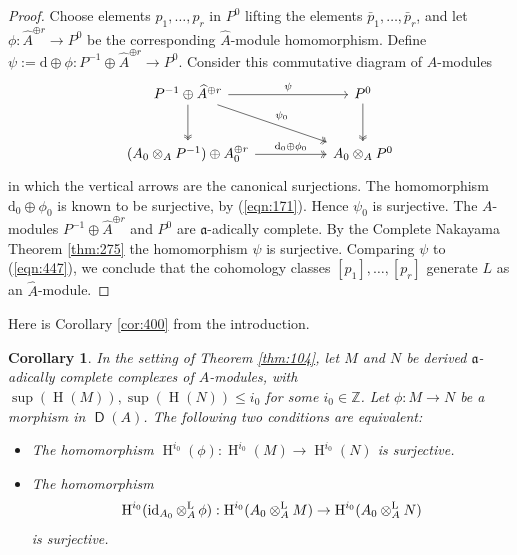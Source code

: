 \documentclass[10pt]{amsart}
\newtheorem{cor}[equation]{Corollary}
\theoremstyle{definition}
\numberwithin{equation}{section}
\newcommand{\opn}{\operatorname}
\newcommand{\cat}[1]{\operatorname{\mathsf{#1}}}
\newcommand{\rmitem}[1]{\item[\textrm{(#1)}]}
\newcommand{\mfrak}[1]{\mathfrak{#1}}
\newcommand{\mrm}[1]{\mathrm{#1}}
\renewcommand{\a}{\mfrak{a}}
\newcommand{\Z}{\mathbb{Z}}
\newcommand{\ot}{\otimes}
\newcommand{\what}[1]{\widehat{#1}}
\renewcommand{\d}{\mathrm{d}}
\newcommand{\msp}[1]{\mspace{#1 mu}}
\begin{document}
\begin{proof}
Choose elements $p_1, \ldots, p_r$ in $P^0$ lifting the elements
$\bar{p}_1, \ldots, \bar{p}_r$,
and let $\phi : \what{A}^{\oplus r} \to P^0$ be
the corresponding $\what{A}$-module homomorphism.
Define
$\psi := \d \oplus \phi : P^{-1} \oplus \what{A}^{\oplus r} \to P^0$.
Consider this commutative diagram of $A$-modules
\[ \begin{tikzcd} [column sep = 12ex, row sep = 6ex]
P^{-1} \oplus \what{A}^{\oplus r}
\ar[d, two heads]
\ar[r, "{\psi}"]
\ar[dr, "{\psi_0}", two heads]
&
P^0
\ar[d, two heads]
\\
(A_0 \ot_{A} P^{-1}) \oplus A_0^{\oplus r}
\ar[r,  two heads, "{\d_0 \oplus \phi_0}"]
&
A_0 \ot_{A} P^{0}
\end{tikzcd} \]
in which the vertical arrows are the canonical surjections. The homomorphism
$\d_0 \oplus \phi_0$ is known to be surjective, by (\ref{eqn:171}).
Hence $\psi_0$ is surjective. The $A$-modules
$P^{-1} \oplus \what{A}^{\oplus r}$ and $P^0$ are
$\a$-adically complete.
By the Complete Nakayama Theorem \ref{thm:275} the
homomorphism $\psi$ is surjective.
Comparing $\psi$ to (\ref{eqn:447}), we conclude that the cohomology
classes $[p_1], \ldots, [p_r]$ generate $L$ as an $\what{A}$-module.
\end{proof}

Here is Corollary \ref{cor:400} from the introduction.

\begin{cor} \label{cor:412}
In the setting of Theorem \ref{thm:104},
let $M$ and $N$ be derived $\a$-adically complete
complexes of $A$-modules, with
$\opn{sup}(\opn{H}(M)), \opn{sup}(\opn{H}(N)) \leq i_0$ for some
$i_0 \in \Z$.
Let $\phi : M \to  N$ be a morphism
in $\cat{D}(A)$.
The following two conditions are equivalent:
\begin{itemize}
\rmitem{i} The homomorphism
$\opn{H}^{i_0}(\phi) : \opn{H}^{i_0}(M) \to \opn{H}^{i_0}(N)$ is surjective.

\rmitem{ii} The homomorphism
\[ \opn{H}^{i_0}(\opn{id}_{A_0} \ot^{\mrm{L}}_{A} \msp{3} \phi) :
\opn{H}^{i_0}(A_0 \ot^{\mrm{L}}_{A} M) \to
\opn{H}^{i_0}(A_0 \ot^{\mrm{L}}_{A} N) \]
is surjective.
\end{itemize}
\end{cor}
\end{document}
